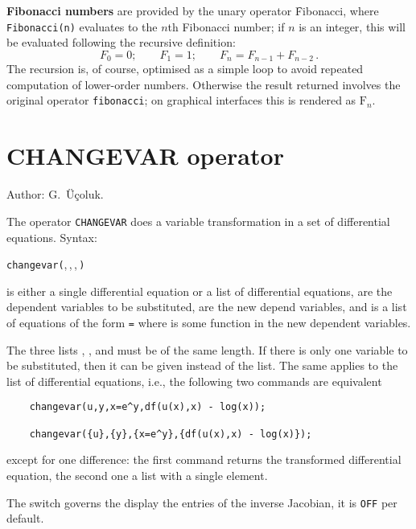 \hypertarget{operator:FIBONACCI}{}
\textbf{Fibonacci numbers} are provided by the unary operator \f{Fibonacci},
where \texttt{Fibonacci(n)} evaluates to the $n$th Fibonacci
number; if $n$ is an integer, this will be evaluated following
the recursive definition:
\[F_0 = 0; \qquad F_1 = 1;\qquad F_n = F_{n-1} + F_{n-2}\,.\]
The recursion is, of course, optimised as a simple loop to avoid repeated
computation of lower-order numbers.
Otherwise the result returned involves the original operator
\texttt{fibonacci}; on graphical interfaces this is rendered
as $\mathrm{F}_n$.

\section{CHANGEVAR operator}
\hypertarget{operator:CHANGEVAR}{}

\noindent
Author: G.~\"{U}\c{c}oluk.

The operator \texttt{CHANGEVAR} does a variable transformation in a set of
differential equations.
Syntax:
\begin{syntaxtable}
  \texttt{changevar(},\,,\,,\,\texttt{)}
\end{syntaxtable}
 is either a single differential equation or a list of
differential equations,  are the dependent variables to
be substituted,  are the new depend variables, and
 is a list of equations of the form 
\texttt{=}  where  is some function
in the new dependent variables.

The three lists , , and  must
be of the same length. If there is only one variable to be
substituted, then it can be given instead of the list. The same applies to the list
of differential equations, i.e., the following two
commands are equivalent
\begin{verbatim}
    changevar(u,y,x=e^y,df(u(x),x) - log(x));

    changevar({u},{y},{x=e^y},{df(u(x),x) - log(x)});
\end{verbatim}
except for one difference: the first command returns the transformed differential
equation, the second one a list with a single element.

\hypertarget{switch:DISPJACOBIAN}{}
The switch  governs the display the entries of the inverse Jacobian,
it is \texttt{OFF} per default.

